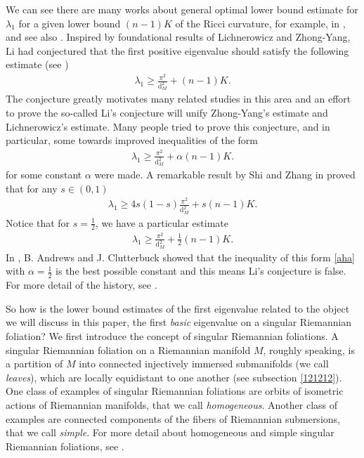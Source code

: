 \documentclass[11pt]{amsart}
\def\d{\mathrm{d}}
\begin{document}
We can see there are many works about general optimal lower bound estimate for $\lambda_1$ for a given lower bound $(n-1)K$ of the Ricci curvature, for example, in \cite{progen,mufawang,benjulie,zhangwang}, and see also \cite{bakryqian,benni, yuehe,xashguoqi}. Inspired by foundational results of Lichnerowicz and Zhong-Yang, Li had conjectured that the first positive eigenvalue should satisfy the following estimate (see \cite{dagang})
\begin{align*}
    \lambda_1\geq\frac{\pi^2}{\d_{M}^2}+(n-1)K.
\end{align*}
The conjecture greatly motivates many related studies in this area and an effort to prove the so-called Li's conjecture will unify Zhong-Yang's estimate and Lichnerowicz's estimate. Many people tried to prove this conjecture, and in particular, some towards improved inequalities of the form
\begin{align}\label{aha}
    \lambda_1\geq\frac{\pi^2}{\d_{M}^2}+\alpha(n-1)K.
\end{align} for some constant $\alpha$ were made. A remarkable result by Shi and Zhang in \cite{shizhang} proved that for any $s\in (0,1)$
\begin{align*}
    \lambda_1\geq4s(1-s)\frac{\pi^2}{\d_M^2}+s(n-1)K.
\end{align*}
Notice that for $s=\frac{1}{2}$, we have a particular estimate
\begin{align*}
    \lambda_1\geq\frac{\pi^2}{\d_M^2}+\frac{1}{2}(n-1)K.
\end{align*} In \cite{benjulie}, B. Andrews and J. Clutterbuck showed that the inequality of this form \ref{aha} with $\alpha=\frac{1}{2}$ is the best possible constant and this means Li's conjecture is false. For more detail of the history, see \cite{yuehe}.





So how is the lower bound estimates of the first eigenvalue related to the object we will discuss in this paper, the first \textit{basic} eigenvalue on a singular Riemannian foliation? We first introduce the concept of singular Riemannian foliations. A singular Riemannian foliation on a Riemannian manifold $M$, roughly speaking, is a partition of $M$ into connected injectively immersed submanifolds (we call \textit{leaves}), which are locally equidistant to one another (see subsection \ref{121212}). One class of examples of singular Riemannian foliations are orbits of isometric actions of Riemannian manifolds, that we call \textit{homogeneous}. Another class of examples are connected components of the fibers of Riemannian submersions, that we call \textit{simple}. For more detail about homogeneous and simple singular Riemannian foliations, see \cite{radeschi}. 
\end{document}
